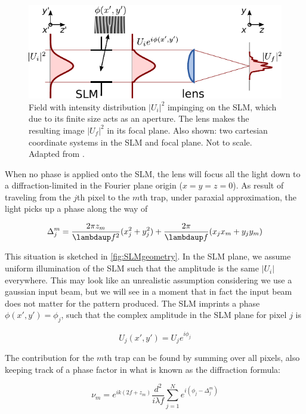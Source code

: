 \begin{figure}
    \centering
    \includegraphics[width = 12cm]{figures/SLMfigure.pdf}
    \caption{Field with intensity distribution $|U_i|^2$ impinging on the SLM, which due to its finite size acts as an aperture. The lens makes the resulting image $|U_f|^2$ in its focal plane. Also shown: two cartesian coordinate systems in the SLM and focal plane. Not to scale. Adapted from \cite{Labuhn2016}.}
    \label{fig:SLMLens}
\end{figure}

When no phase is applied onto the SLM, the lens will focus all the light down to a diffraction-limited in the Fourier plane origin ($x=y=z=0$). As result of traveling from the $j$th pixel to the $m$th trap, under paraxial approximation, the light picks up a phase along the way of 

\begin{equation}\label{eq:PropagationPhase}
    \Delta_j^m = \frac{2\pi z_m}{\lambdaup f^2}(x_j^2+y_j^2)+\frac{2\pi}{\lambdaup f}(x_j x_m +y_j y_m)
\end{equation}

This situation is sketched in \cref{fig:SLMgeometry}. In the SLM plane, we assume uniform illumination of the SLM such that the amplitude is the same $|U_i|$ everywhere. This may look like an unrealistic assumption considering we use a gaussian input beam, but we will see in a moment that in fact the input beam does not matter for the pattern produced. The SLM imprints a phase $\phi(x',y') = \phi_j$, such that the complex amplitude in the SLM plane for pixel $j$ is

\begin{equation}
    U_j(x',y') = U_j e^{i \phi_j}
\end{equation}

The contribution for the $m$th trap can be found by summing over all pixels, also keeping track of a phase factor in what is known as the diffraction formula:

\begin{equation}\label{eq:DiffractionFormula}
    \nu_m = e^{i k \left(2 f + z_m\right)}
    \frac{d^2}{i \lambda f} \sum_{j=1}^N e^{i(\phi_j - \Delta_j^m)}
\end{equation}

